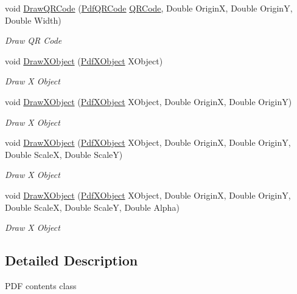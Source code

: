 \begin{DoxyCompactItemize}
void \hyperlink{class_pdf_file_writer_1_1_pdf_contents_a650f2b907bf8fc8818222c2b911dbd75}{Draw\+Q\+R\+Code} (\hyperlink{class_pdf_file_writer_1_1_pdf_q_r_code}{Pdf\+Q\+R\+Code} \hyperlink{namespace_pdf_file_writer_a45e52c090a4d8e1333577773ec0bac4aafa811db54f4402f9f1e86a15ce174ca8}{Q\+R\+Code}, Double OriginX, Double OriginY, Double Width)
\begin{DoxyCompactList}\small\item\em Draw QR Code \end{DoxyCompactList}\item 
void \hyperlink{class_pdf_file_writer_1_1_pdf_contents_a9f331fc4d3814726b2630deca74bddae}{Draw\+X\+Object} (\hyperlink{class_pdf_file_writer_1_1_pdf_x_object}{Pdf\+X\+Object} X\+Object)
\begin{DoxyCompactList}\small\item\em Draw X Object \end{DoxyCompactList}\item 
void \hyperlink{class_pdf_file_writer_1_1_pdf_contents_aa7275070ebf681b36bf1e78c52b6f553}{Draw\+X\+Object} (\hyperlink{class_pdf_file_writer_1_1_pdf_x_object}{Pdf\+X\+Object} X\+Object, Double OriginX, Double OriginY)
\begin{DoxyCompactList}\small\item\em Draw X Object \end{DoxyCompactList}\item 
void \hyperlink{class_pdf_file_writer_1_1_pdf_contents_ae1d1d8a0d52af7ca5f7da5f098ad8127}{Draw\+X\+Object} (\hyperlink{class_pdf_file_writer_1_1_pdf_x_object}{Pdf\+X\+Object} X\+Object, Double OriginX, Double OriginY, Double ScaleX, Double ScaleY)
\begin{DoxyCompactList}\small\item\em Draw X Object \end{DoxyCompactList}\item 
void \hyperlink{class_pdf_file_writer_1_1_pdf_contents_af98b49b8d8aa68de3f7cc68ad638e132}{Draw\+X\+Object} (\hyperlink{class_pdf_file_writer_1_1_pdf_x_object}{Pdf\+X\+Object} X\+Object, Double OriginX, Double OriginY, Double ScaleX, Double ScaleY, Double Alpha)
\begin{DoxyCompactList}\small\item\em Draw X Object \end{DoxyCompactList}\end{DoxyCompactItemize}


\subsection{Detailed Description}
P\+DF contents class 

